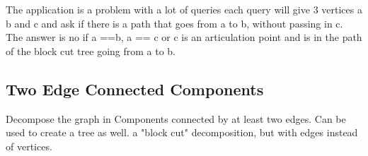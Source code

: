     The application is a problem with a lot of queries
    each query will give 3 vertices a b and c and ask if there is a path that goes from a to b, without passing in c.
    The answer is no if a ==b, a == c or c is an articulation point and is in the path of the block cut tree going from a to b.
    

    \subsection{Two Edge Connected Components}
    Decompose the graph in Components connected by at least two edges.
    Can be used to create a tree as well. a "block cut" decomposition, but with edges instead of vertices.

    

    

    